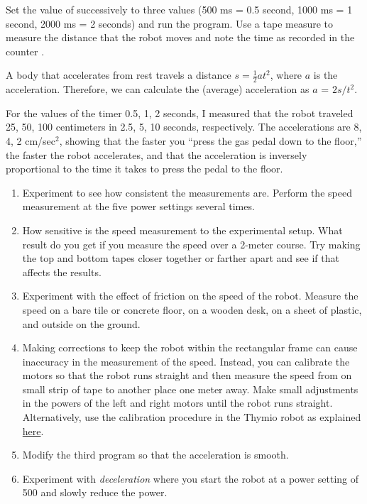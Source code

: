  Set the value of 
successively to three values (500 ms = 0.5 second, 1000 ms = 1 second,
2000 ms = 2 seconds) and run the program. Use a tape measure to measure
the distance that the robot moves and note the time as recorded in the
counter .

A body that accelerates from rest travels a distance $s =
\frac{1}{2}at^2$, where $a$ is the acceleration. Therefore, we can
calculate the (average) acceleration as $a$ = $2s/t^2$.

For the values of the timer 0.5, 1, 2 seconds, I measured that the robot
traveled 25, 50, 100 centimeters in 2.5, 5, 10 seconds, respectively.
The accelerations are 8, 4, 2 cm/sec$^2$, showing that the faster you
``press the gas pedal down to the floor,'' the faster the robot
accelerates, and that the acceleration is inversely proportional to the
time it takes to press the pedal to the floor.


\begin{enumerate}

\item Experiment to see how consistent the measurements are.
Perform the speed measurement at the five power settings several times.

\item How sensitive is the speed measurement to the experimental setup.
What result do you get if you measure the speed over a 2-meter course.
Try making the top and bottom tapes closer together or farther apart and
see if that affects the results.

\item Experiment with the effect of friction on the speed of the robot.
Measure the speed on a bare tile or concrete floor, on a wooden desk, on
a sheet of plastic, and outside on the ground.

\item Making corrections to keep the robot within the rectangular frame
can cause inaccuracy in the measurement of the speed. Instead, you can
calibrate the motors so that the robot runs straight and then measure
the speed from on small strip of tape to another place one meter away.
Make small adjustments in the powers of the left and right motors until
the robot runs straight. Alternatively, use the calibration procedure
in the Thymio robot as explained \href{https://www.thymio.org/en:thymiomotorcalibration}{here}.

\item Modify the third program so that the acceleration is smooth.

\item Experiment with \emph{deceleration} where you start the robot at a
power setting of 500 and slowly reduce the power.

\end{enumerate}
